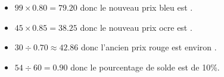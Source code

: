 \begin{corrige}
\begin{changemargin}{-7mm}{-7mm}
    \medskip
    {\color{red}
    \begin{itemize}
        \item $99\times\num{0.80}=\num{79.20}$ donc le nouveau prix bleu est .
        \item $45\times\num{0.85}=\num{38.25}$ donc le nouveau prix ocre est .
        \item $30\div\num{0.70}\approx\num{42.86}$ donc l'ancien prix rouge est environ .
        \item $54\div 60=\num{0.90}$ donc le pourcentage de solde est de 10\%.
    \end{itemize}
    }
    \end{changemargin}
\end{corrige}
